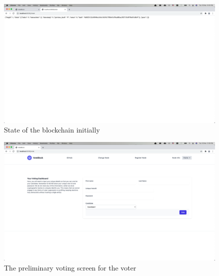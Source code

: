 \documentclass{article}
\begin{document}
    \begin{figure}[h]
        \centering
        \includegraphics[width=1\textwidth]{dump_before_votes.png}
        \caption{State of the blockchain initially}
    \end{figure}
    \begin{figure}[h]
        \centering
        \includegraphics[width=1\textwidth]{voting_screen.png}
        \caption{The preliminary voting screen for the voter}
    \end{figure}
\end{document}
